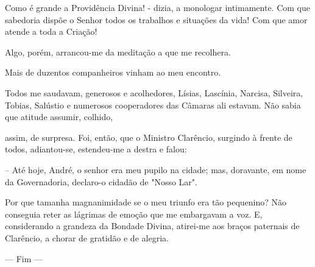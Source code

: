\documentclass[portuguese,12pt,a4paper]{scrbook}
\begin{document}
	Como é grande a Providência Divina! - dizia, a monologar intimamente. Com que sabedoria dispõe o Senhor todos os trabalhos e situações da vida! Com que amor atende a toda a Criação!
	
	Algo, porém, arrancou-me da meditação a que me recolhera.
	
	Mais de duzentos companheiros vinham ao meu encontro.
	
	Todos me saudavam, generosos e acolhedores, Lísias, Lascínia, Narcisa, Silveira, Tobias, Salústio e numerosos cooperadores das Câmaras ali estavam. Não sabia que atitude assumir, colhido,
	
	
	assim, de surpresa. Foi, então, que o Ministro Clarêncio, surgindo à frente de todos, adiantou-se, estendeu-me a destra e falou:
	
	– Até hoje, André, o senhor era meu pupilo na cidade; mas, doravante, em nome da Governadoria, declaro-o cidadão de "Nosso Lar".
	
	Por que tamanha magnanimidade se o meu triunfo era tão pequenino? Não conseguia reter as lágrimas de emoção que me embargavam a voz. E, considerando a grandeza da Bondade Divina, atirei-me aos braços paternais de Clarêncio, a chorar de gratidão e de alegria.
	
	\begin{center}--- Fim ---\end{center}
	

	
\end{document}

